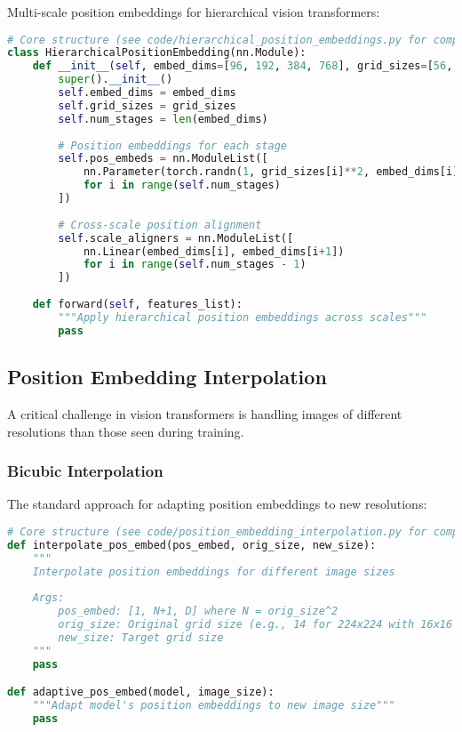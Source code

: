 Multi-scale position embeddings for hierarchical vision transformers:

\begin{lstlisting}[language=Python, caption=Hierarchical position embeddings]
# Core structure (see code/hierarchical_position_embeddings.py for complete implementation)
class HierarchicalPositionEmbedding(nn.Module):
    def __init__(self, embed_dims=[96, 192, 384, 768], grid_sizes=[56, 28, 14, 7]):
        super().__init__()
        self.embed_dims = embed_dims
        self.grid_sizes = grid_sizes
        self.num_stages = len(embed_dims)
        
        # Position embeddings for each stage
        self.pos_embeds = nn.ModuleList([
            nn.Parameter(torch.randn(1, grid_sizes[i]**2, embed_dims[i]) * 0.02)
            for i in range(self.num_stages)
        ])
        
        # Cross-scale position alignment
        self.scale_aligners = nn.ModuleList([
            nn.Linear(embed_dims[i], embed_dims[i+1])
            for i in range(self.num_stages - 1)
        ])
    
    def forward(self, features_list):
        """Apply hierarchical position embeddings across scales"""
        pass
\end{lstlisting}

\subsection{Position Embedding Interpolation}

A critical challenge in vision transformers is handling images of different resolutions than those seen during training.

\subsubsection{Bicubic Interpolation}

The standard approach for adapting position embeddings to new resolutions:

\begin{lstlisting}[language=Python, caption=Position embedding interpolation for different resolutions]
# Core structure (see code/position_embedding_interpolation.py for complete implementation)
def interpolate_pos_embed(pos_embed, orig_size, new_size):
    """
    Interpolate position embeddings for different image sizes
    
    Args:
        pos_embed: [1, N+1, D] where N = orig_size^2
        orig_size: Original grid size (e.g., 14 for 224x224 with 16x16 patches)
        new_size: Target grid size
    """
    pass

def adaptive_pos_embed(model, image_size):
    """Adapt model's position embeddings to new image size"""
    pass
\end{lstlisting}

